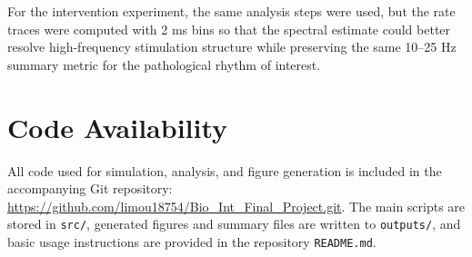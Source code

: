 \documentclass[11pt]{article}
\begin{document}
For the intervention experiment, the same analysis steps were used, but the rate traces were computed with 2 ms bins so that the spectral estimate could better resolve high-frequency stimulation structure while preserving the same 10--25 Hz summary metric for the pathological rhythm of interest.

\section*{Code Availability}
All code used for simulation, analysis, and figure generation is included in the accompanying Git repository: \url{https://github.com/limou18754/Bio_Int_Final_Project.git}. The main scripts are stored in \texttt{src/}, generated figures and summary files are written to \texttt{outputs/}, and basic usage instructions are provided in the repository \texttt{README.md}.



\end{document}
